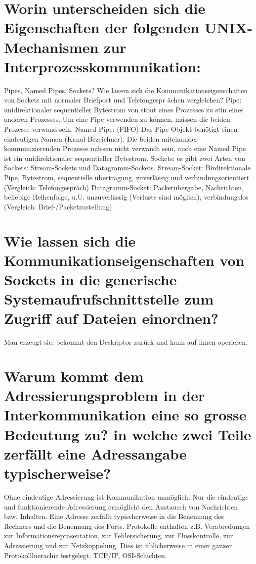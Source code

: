 \documentclass[12pt,a4paper,ngerman]{scrartcl}
\newcommand{\question}[1]{#1}
\newenvironment {answer}
                {}
                {}
\begin{document}
\section{\question{Worin unterscheiden sich die Eigenschaften der folgenden UNIX-Mechanismen zur Interprozesskommunikation:}}
\begin{answer}
Pipes, Named Pipes, Sockets?
Wie lassen sich die Kommunikationseigenschaften von Sockets mit normaler Briefpost und Telefongespr
ächen vergleichen?
Pipe: unidirektionaler sequentieller Bytestrom von stout eines Prozesses zu stin eines anderen
Prozesses. Um eine Pipe verwenden zu können, müssen die beiden Prozesse verwand sein.
Named Pipe: (FIFO) Das Pipe-Objekt benötigt einen eindeutigen Namen (Kanal-Bezeichner). Die
beiden miteinander kommunizierenden Prozesse müssen nicht verwandt sein, auch eine Named Pipe
ist ein unidirektionaler sequentieller Bytestrom.
Sockets: es gibt zwei Arten von Sockets: Stream-Sockets und Datagramm-Sockets.
Stream-Socket: Birdirektionale Pipe, Bytestrom, sequentielle übertragung, zuverlässig und verbindungsorientiert
(Vergleich: Telefongespräch)
Datagramm-Socket: Packetübergabe, Nachrichten, beliebige Reihenfolge, u.U. unzuverlässig (Verluste
sind möglich), verbindungslos (Vergleich: Brief-/Packetzustellung)
\end{answer}

\section{\question{Wie lassen sich die Kommunikationseigenschaften von Sockets in die generische Systemaufrufschnittstelle zum Zugriff auf Dateien einordnen?}}
\begin{answer}
Man erzeugt sie, bekommt den Deskriptor zurück und kann auf ihnen operieren.
\end{answer}

\section{\question{Warum kommt dem Adressierungsproblem in der Interkommunikation eine so grosse Bedeutung zu? in welche zwei Teile zerfällt eine Adressangabe typischerweise?}}
\begin{answer}
Ohne eindeutige Adressierung ist Kommunikation unmöglich. Nur die eindeutige und funktionierende
Adressierung ermöglicht den Austausch von Nachrichten bzw. Inhalten.
Eine Adresse zerfällt typischerweise in die Benennung des Rechners und die Benennung des Ports.
Protokolle enthalten z.B. Verabredungen zur Informationsrepräsentation, zur Fehlersicherung, zur
Flusskontrolle, zur Adressierung und zur Netzkoppelung. Dies ist üblicherweise in einer ganzen
Protokollhierachie festgelegt, TCP/IP, OSI-Schichten.
\end{answer}
\end{document}
